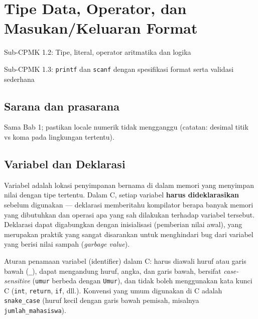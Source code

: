 \documentclass[../main.tex]{subfiles}
\begin{document}
\chapter{Tipe Data, Operator, dan Masukan/Keluaran Format}

\begin{subcpmk}
  \item Sub-CPMK 1.2: Tipe, literal, operator aritmatika dan logika
  \item Sub-CPMK 1.3: \texttt{printf} dan \texttt{scanf} dengan spesifikasi format serta validasi sederhana
\end{subcpmk}


\section{Sarana dan prasarana}

Sama Bab 1; pastikan locale numerik tidak mengganggu (catatan: desimal titik vs koma pada lingkungan tertentu).

\section{Variabel dan Deklarasi}

Variabel adalah lokasi penyimpanan bernama di dalam memori yang menyimpan nilai dengan tipe tertentu. Dalam C, setiap variabel \textbf{harus dideklarasikan} sebelum digunakan --- deklarasi memberitahu kompilator berapa banyak memori yang dibutuhkan dan operasi apa yang sah dilakukan terhadap variabel tersebut. Deklarasi dapat digabungkan dengan inisialisasi (pemberian nilai awal), yang merupakan praktik yang sangat disarankan untuk menghindari bug dari variabel yang berisi nilai sampah (\textit{garbage value}).

Aturan penamaan variabel (identifier) dalam C: harus diawali huruf atau garis bawah (\texttt{\_}), dapat mengandung huruf, angka, dan garis bawah, bersifat \textit{case-sensitive} (\texttt{umur} berbeda dengan \texttt{Umur}), dan tidak boleh menggunakan kata kunci C (\texttt{int}, \texttt{return}, \texttt{if}, dll.). Konvensi yang umum digunakan di C adalah \texttt{snake\_case} (huruf kecil dengan garis bawah pemisah, misalnya \texttt{jumlah\_mahasiswa}).
\end{document}
